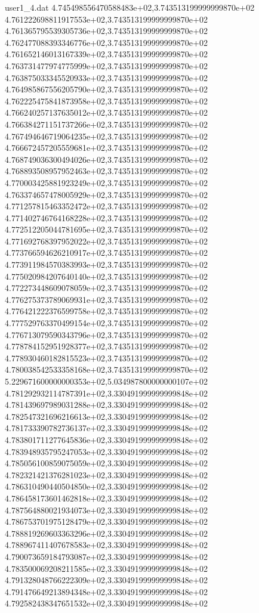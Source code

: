 \begin{filecontents}{user1_4.dat}
4.745498556470588483e+02,3.743513199999999870e+02
4.761222698811917553e+02,3.743513199999999870e+02
4.761365795539305736e+02,3.743513199999999870e+02
4.762477088393346776e+02,3.743513199999999870e+02
4.761652146013167339e+02,3.743513199999999870e+02
4.763731477974775999e+02,3.743513199999999870e+02
4.763875033345520933e+02,3.743513199999999870e+02
4.764985867556205790e+02,3.743513199999999870e+02
4.762225475841873958e+02,3.743513199999999870e+02
4.766240257137635012e+02,3.743513199999999870e+02
4.766384271151737266e+02,3.743513199999999870e+02
4.767494646719064235e+02,3.743513199999999870e+02
4.766672457205559681e+02,3.743513199999999870e+02
4.768749036300494026e+02,3.743513199999999870e+02
4.768893508957952463e+02,3.743513199999999870e+02
4.770003425881923249e+02,3.743513199999999870e+02
4.763374657478005929e+02,3.743513199999999870e+02
4.771257815463352472e+02,3.743513199999999870e+02
4.771402746764168228e+02,3.743513199999999870e+02
4.772512205044781695e+02,3.743513199999999870e+02
4.771692768397952022e+02,3.743513199999999870e+02
4.773766594626210917e+02,3.743513199999999870e+02
4.773911984570383993e+02,3.743513199999999870e+02
4.775020984207640140e+02,3.743513199999999870e+02
4.772273448609078059e+02,3.743513199999999870e+02
4.776275373789069931e+02,3.743513199999999870e+02
4.776421222376599758e+02,3.743513199999999870e+02
4.777529763370499154e+02,3.743513199999999870e+02
4.776713079590343796e+02,3.743513199999999870e+02
4.778784152951928377e+02,3.743513199999999870e+02
4.778930460182815523e+02,3.743513199999999870e+02
4.780038542533358168e+02,3.743513199999999870e+02
5.229671600000000353e+02,5.034987800000000107e+02
4.781292932114787391e+02,3.330491999999999848e+02
4.781439697989031288e+02,3.330491999999999848e+02
4.782547321696216613e+02,3.330491999999999848e+02
4.781733390782736137e+02,3.330491999999999848e+02
4.783801711277645836e+02,3.330491999999999848e+02
4.783948935795247053e+02,3.330491999999999848e+02
4.785056100859075059e+02,3.330491999999999848e+02
4.782321421376281023e+02,3.330491999999999848e+02
4.786310490440504850e+02,3.330491999999999848e+02
4.786458173601462818e+02,3.330491999999999848e+02
4.787564880021934073e+02,3.330491999999999848e+02
4.786753701975128479e+02,3.330491999999999848e+02
4.788819269603363296e+02,3.330491999999999848e+02
4.788967411407678583e+02,3.330491999999999848e+02
4.790073659184793087e+02,3.330491999999999848e+02
4.783500069208211585e+02,3.330491999999999848e+02
4.791328048766222309e+02,3.330491999999999848e+02
4.791476649213894348e+02,3.330491999999999848e+02
4.792582438347651532e+02,3.330491999999999848e+02

\end{filecontents}

